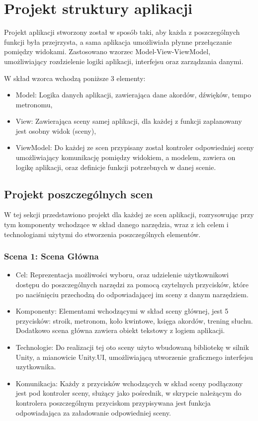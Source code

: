 \section{Projekt struktury aplikacji}

Projekt aplikacji stworzony został w sposób taki, aby każda z poszczególnych funkcji była przejrzysta, a sama aplikacja umożliwiała płynne przełączanie pomiędzy widokami. Zastosowano wzorzec Model-View-ViewModel, umożliwiający rozdzielenie logiki aplikacji, interfejsu oraz zarządzania danymi. 

W skład wzorca wchodzą poniższe 3 elementy:

\begin{itemize}
	\item Model: Logika danych aplikacji, zawierająca dane akordów, dźwięków, tempo metronomu,
	\item View: Zawierająca sceny samej aplikacji, dla każdej z funkcji zaplanowany jest osobny widok (sceny),
	\item ViewModel: Do każdej ze scen przypisany został kontroler odpowiedniej sceny umożliwiający komunikację pomiędzy widokiem, a modelem, zawiera on logikę aplikacji, oraz definicje funkcji potrzebnych w danej scenie.
\end{itemize}

\subsection{Projekt poszczególnych scen}

W tej sekcji przedstawiono projekt dla każdej ze scen aplikacji, rozrysowując przy tym komponenty wchodzące w skład danego narzędzia, wraz z ich celem i technologiami użytymi do stworzenia poszczególnych elementów. 

\subsubsection{Scena 1: Scena Główna}

\begin{itemize}

\item Cel: Reprezentacja możliwości wyboru, oraz udzielenie użytkownikowi dostępu do poszczególnych narzędzi za pomocą czytelnych przycisków, które po naciśnięciu przechodzą do odpowiadającej im sceny z danym narzędziem. 
\item Komponenty: Elementami wchodzącymi w skład sceny głównej, jest 5 przycisków: stroik, metronom, koło kwintowe, księga akordów, trening słuchu. Dodatkowo scena główna zawiera obiekt tekstowy z logiem aplikacji.  
\item Technologie: Do realizacji tej oto sceny użyto wbudowaną bibliotekę w silnik Unity, a mianowicie Unity.UI, umożliwiającą utworzenie graficznego interfejsu uzytkownika. 
\item Komunikacja: Każdy z przycisków wchodzących w skład sceny podłączony jest pod kontroler sceny, służący jako pośrednik, w skrypcie należącym do kontrolera poszczególnym przyciskom przypisywana jest funkcja odpowiadająca za załadowanie odpowiedniej sceny. 
\end{itemize}


